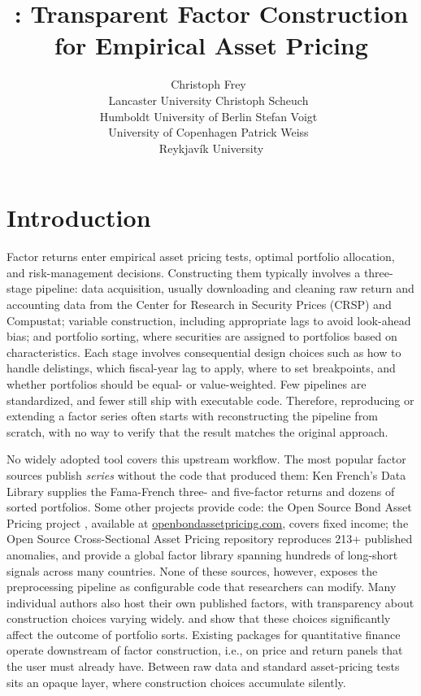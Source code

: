 \documentclass[
  article]{jss}
\author{Christoph Frey~\orcidlink{0000-0002-9937-0903}\\Lancaster
University \And Christoph
Scheuch~\orcidlink{0009-0004-0423-6819}\\Humboldt University of
Berlin \AND Stefan Voigt~\orcidlink{0000-0001-5619-3161}\\University of
Copenhagen \And Patrick Weiss~\orcidlink{0000-0002-9282-5872}\\Reykjavík
University}
\title{\pkg{tidyfinance}: Transparent Factor Construction for Empirical
Asset Pricing}
\begin{document}
\maketitle


\section{Introduction}\label{sec-intro}

Factor returns enter empirical asset pricing tests, optimal portfolio
allocation, and risk-management decisions. Constructing them typically
involves a three-stage pipeline: data acquisition, usually downloading
and cleaning raw return and accounting data from the Center for Research
in Security Prices (CRSP) and Compustat; variable construction,
including appropriate lags to avoid look-ahead bias; and portfolio
sorting, where securities are assigned to portfolios based on
characteristics. Each stage involves consequential design choices such
as how to handle delistings, which fiscal-year lag to apply, where to
set breakpoints, and whether portfolios should be equal- or
value-weighted. Few pipelines are standardized, and fewer still ship
with executable code. Therefore, reproducing or extending a factor
series often starts with reconstructing the pipeline from scratch, with
no way to verify that the result matches the original approach.

No widely adopted tool covers this upstream workflow. The most popular
factor sources publish \emph{series} without the code that produced
them: Ken French's Data Library \citep{fama.2023} supplies the
Fama-French three- and five-factor returns and dozens of sorted
portfolios. Some other projects provide code: the Open Source Bond Asset
Pricing project \citep{dickerson.2023}, available at
\href{https://openbondassetpricing.com/}{openbondassetpricing.com},
covers fixed income; the Open Source Cross-Sectional Asset Pricing
repository \citep{chen.2022} reproduces 213+ published anomalies, and
\citet{jensen.2023} provide a global factor library spanning hundreds of
long-short signals across many countries. None of these sources,
however, exposes the preprocessing pipeline as configurable code that
researchers can modify. Many individual authors also host their own
published factors, with transparency about construction choices varying
widely. \citet{walter.2024} and \citet{soebhag.2024} show that these
choices significantly affect the outcome of portfolio sorts. Existing
 packages for quantitative finance operate downstream of
factor construction, i.e., on price and return panels that the user must
already have. Between raw data and standard asset-pricing tests sits an
opaque layer, where construction choices accumulate silently.
\end{document}
